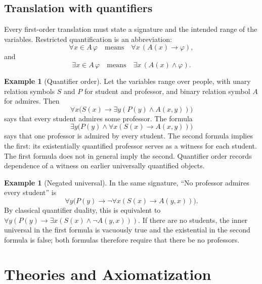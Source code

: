 \documentclass[11pt,oneside,openany]{book}
\theoremstyle{definition}
\newtheorem{example}[definition]{Example}
\theoremstyle{plain}
\theoremstyle{remark}
\begin{document}
\section{Translation with quantifiers}
\label{sec:fol-semantics-03}

Every first-order translation must state a signature and the intended range of
the variables.  Restricted quantification is an abbreviation:
\[
 \forall x\in A\,\varphi\quad\text{means}\quad
 \forall x\,(A(x)\to\varphi),
\]
and
\[
 \exists x\in A\,\varphi\quad\text{means}\quad
 \exists x\,(A(x)\land\varphi).
\]

\begin{example}[Quantifier order]
Let the variables range over people, with unary relation symbols
\(S\) and \(P\) for student and professor, and binary relation symbol \(A\)
for admires.  Then
\[
 \forall x\bigl(S(x)\to
   \exists y(P(y)\land A(x,y))\bigr)
\]
says that every student admires some professor.  The formula
\[
 \exists y\bigl(P(y)\land
   \forall x(S(x)\to A(x,y))\bigr)
\]
says that one professor is admired by every student.  The second formula
implies the first: its existentially quantified professor serves as a witness
for each student.  The first formula does not in general imply the second.
Quantifier order records dependence of a witness on earlier
universally quantified objects.
\end{example}

\begin{example}[Negated universal]
In the same signature, ``No professor admires every student'' is
\[
 \forall y\bigl(P(y)\to
   \neg\forall x(S(x)\to A(y,x))\bigr).
\]
By classical quantifier duality, this is equivalent to
\(\forall y(P(y)\to\exists x(S(x)\land\neg A(y,x)))\).  If there are no
students, the inner universal in the first formula is vacuously true and the
existential in the second formula is false; both formulas therefore require
that there be no professors.
\end{example}

\chapter{Theories and Axiomatization}
\label{ch:fol-theories}
\end{document}
